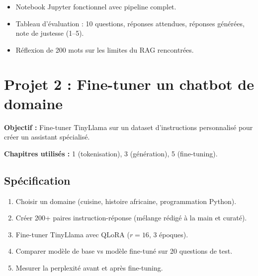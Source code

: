 \begin{itemize}
  \item Notebook Jupyter fonctionnel avec pipeline complet.
  \item Tableau d'\'evaluation : 10 questions, r\'eponses attendues, r\'eponses g\'en\'er\'ees, note de justesse (1--5).
  \item R\'eflexion de 200 mots sur les limites du RAG rencontr\'ees.
\end{itemize}

\section{Projet 2 : Fine-tuner un chatbot de domaine}

\textbf{Objectif :} Fine-tuner TinyLlama sur un dataset d'instructions personnalis\'e pour cr\'eer un assistant sp\'ecialis\'e.

\textbf{Chapitres utilis\'es :} 1 (tokenisation), 3 (g\'en\'eration), 5 (fine-tuning).

\subsection{Sp\'ecification}

\begin{enumerate}
  \item Choisir un domaine (cuisine, histoire africaine, programmation Python).
  \item Cr\'eer 200+ paires instruction-r\'eponse (m\'elange r\'edig\'e \`a la main et curat\'e).
  \item Fine-tuner TinyLlama avec QLoRA ($r=16$, 3 \'epoques).
  \item Comparer mod\`ele de base vs mod\`ele fine-tun\'e sur 20 questions de test.
  \item Mesurer la perplexit\'e avant et apr\`es fine-tuning.
\end{enumerate}

